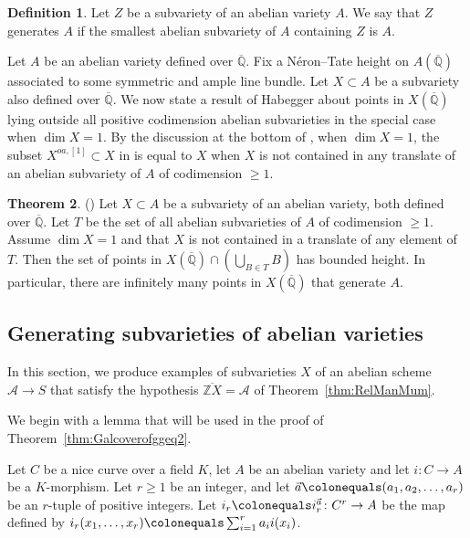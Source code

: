 \documentclass[reqno,10pt]{amsart}
\theoremstyle{definition}
\newtheorem{thm}{Theorem}[section]
\theoremstyle{definition}
\newtheorem{defn}[thm]{Definition}
\def\Z{{\mathbb Z}}
\def\Q{{\mathbb Q}}
\def\Qbar{\overline{\mathbb{Q}}}
\begin{document}
\begin{defn} Let $Z$ be a subvariety of an abelian variety $A$. We say that $Z$  generates $A$ if the smallest abelian subvariety of $A$ containing $Z$ is $A$.  
\end{defn}

Let $A$ be an abelian variety defined over $\Qbar$. Fix a N\'{e}ron--Tate height on $A(\Qbar)$ associated to some symmetric and ample line bundle. Let  $X \subset A$ be a subvariety also defined over $\overline{\Q}$. We now state a result of Habegger about points in $X(\Qbar)$ lying outside all positive codimension abelian subvarieties in the special case when $\dim X = 1$. By the discussion at the bottom of \cite[Page~406]{HabeggerCompDim}, when $\dim X = 1$, the subset $X^{oa,[1]} \subset X$ in \cite[Page~407, Theorem]{HabeggerCompDim} is equal to $X$ when $X$ is not contained in any translate of an abelian subvariety of $A$ of codimension $\geq 1$.
\begin{thm}\label{thm:Habeggerboundedheight}(\cite[Theorem]{HabeggerCompDim}) Let $X \subset A$ be a subvariety of an abelian variety, both defined over $\Qbar$. Let $T$ be the set of all abelian subvarieties of $A$ of codimension $\geq 1$. Assume $\dim X = 1$ and that $X$ is not contained in a translate of any element of $T$. Then the set of points in $X(\Qbar) \cap \left(\bigcup_{B \in T} B \right)$ has bounded height. In particular, there are infinitely many points in $X(\Qbar)$ that generate $A$.
\end{thm}

\subsection{Generating subvarieties of abelian varieties}

In this section, we produce examples of subvarieties $X$ of an abelian scheme $\mathcal{A} \rightarrow S$ that satisfy the hypothesis $\overline{\Z X} = \mathcal{A}$ of Theorem~\ref{thm:RelManMum}.


We begin with a lemma that will be used in the proof of Theorem~\ref{thm:Galcoverofggeq2}.
 

Let $C$ be a nice curve over a field $K$, let $A$ be an abelian variety and let $i \colon C \rightarrow A$ be a $K$-morphism. Let $r \geq 1$ be an integer, and let $\vec{a} \colonequals (a_1,a_2,\ldots,a_r)$ be an $r$-tuple of positive integers.  Let $i_r \colonequals i_r^{\vec{a}} \colon C^r \rightarrow A$ be the map defined by $i_r(x_1,\ldots,x_r) \colonequals \sum_{i=1}^r a_i i(x_i)$. 
\end{document}
